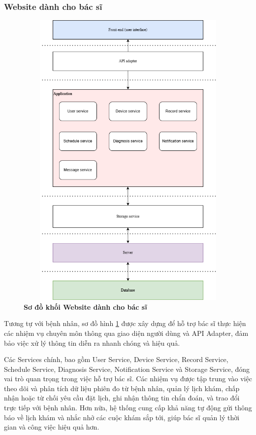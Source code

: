 \subsubsection{Website dành cho bác sĩ}
\begin{figure}[H]
	\centering
	\includegraphics[width=12cm,height=15cm]{Images/System/fmECG_architecture-Doctors.drawio.png}
	\caption[Sơ đồ khối Website dành cho bác sĩ]{\bfseries \fontsize{12pt}{0pt}\selectfont Sơ đồ khối Website dành cho bác sĩ}
	\label{fmECG_architecture-Doctor} %
\end{figure}

Tương tự với bệnh nhân, sơ đồ hình \ref{fmECG_architecture-Doctor} được xây dựng để hỗ trợ bác sĩ thực hiện các nhiệm vụ chuyên môn thông qua giao diện người dùng và API Adapter, đảm bảo việc xử lý thông tin diễn ra nhanh chóng và hiệu quả.

Các Services chính, bao gồm User Service, Device Service, Record Service, Schedule Service, Diagnosis Service, Notification Service và Storage Service, đóng vai trò quan trọng trong việc hỗ trợ bác sĩ.
Các nhiệm vụ được tập trung vào việc theo dõi và phân tích dữ liệu phiên đo từ bệnh nhân, quản lý lịch khám, chấp nhận hoặc từ chối yêu cầu đặt lịch, ghi nhận thông tin chẩn đoán, và trao đổi trực tiếp với bệnh nhân.
Hơn nữa, hệ thống cung cấp khả năng tự động gửi thông báo về lịch khám và nhắc nhở các cuộc khám sắp tới, giúp bác sĩ quản lý thời gian và công việc hiệu quả hơn.

